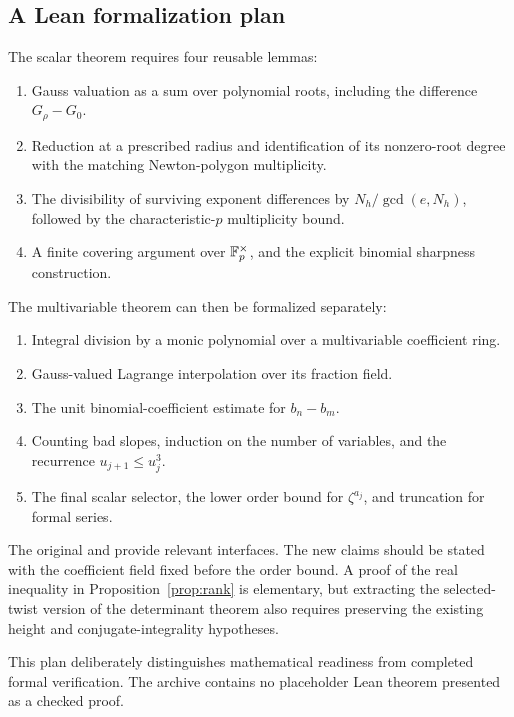 \subsection{A Lean formalization plan}
The scalar theorem requires four reusable lemmas:
\begin{enumerate}
\item Gauss valuation as a sum over polynomial roots, including the difference $G_\rho-G_0$.
\item Reduction at a prescribed radius and identification of its nonzero-root degree with the matching Newton-polygon multiplicity.
\item The divisibility of surviving exponent differences by $N_h/\gcd(e,N_h)$, followed by the characteristic-$p$ multiplicity bound.
\item A finite covering argument over $\mathbb F_p^\times$, and the explicit binomial sharpness construction.
\end{enumerate}
The multivariable theorem can then be formalized separately:
\begin{enumerate}
\item Integral division by a monic polynomial over a multivariable coefficient ring.
\item Gauss-valued Lagrange interpolation over its fraction field.
\item The unit binomial-coefficient estimate for $b_n-b_m$.
\item Counting bad slopes, induction on the number of variables, and the recurrence $u_{j+1}\le u_j^3$.
\item The final scalar selector, the lower order bound for $\zeta^{a_j}$, and truncation for formal series.
\end{enumerate}
The original  and  provide relevant interfaces. The new claims should be stated with the coefficient field fixed before the order bound. A proof of the real inequality in Proposition~\ref{prop:rank} is elementary, but extracting the selected-twist version of the determinant theorem also requires preserving the existing height and conjugate-integrality hypotheses.

This plan deliberately distinguishes mathematical readiness from completed formal verification. The archive contains no placeholder Lean theorem presented as a checked proof.

